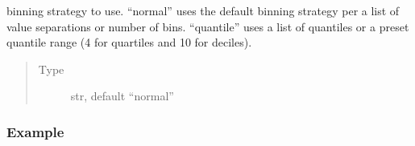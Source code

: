 \documentclass[letterpaper,10pt,english]{sphinxmanual}
\begin{document}
\begin{fulllineitems}
\begin{fulllineitems}
\end{fulllineitems}


\begin{fulllineitems}
\label{\detokenize{dalio.pipe:dalio.pipe.col_generation.Bin.bin_strat}}
binning strategy to use. “normal”
uses the default binning strategy per a list of value separations
or number of bins. “quantile” uses a list of quantiles or a
preset quantile range (4 for quartiles and 10 for deciles).
\begin{quote}\begin{description}
\item[{Type}] \leavevmode
str, default “normal”

\end{description}\end{quote}

\end{fulllineitems}

\subsubsection*{Example}


\end{fulllineitems}
\end{document}
